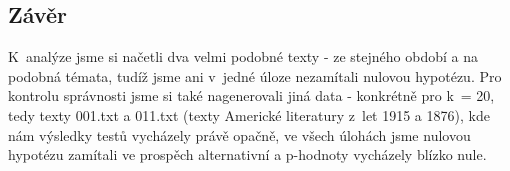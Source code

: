 \documentclass[11pt]{article}
\begin{document}
    \subsection*{Závěr}\label{zuxe1vux11br}

K~analýze jsme si načetli dva velmi podobné texty - ze stejného období a
na podobná témata, tudíž jsme ani v~jedné úloze nezamítali nulovou
hypotézu. Pro kontrolu správnosti jsme si také nagenerovali jiná data -
konkrétně pro k~= 20, tedy texty 001.txt a 011.txt (texty Americké
literatury z~let 1915 a 1876), kde nám výsledky testů vycházely právě
opačně, ve všech úlohách jsme nulovou hypotézu zamítali ve prospěch
alternativní a p-hodnoty vycházely blízko nule.


    
    
    
    
\end{document}
